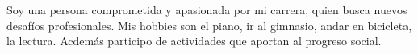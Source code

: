 Soy una persona comprometida y apasionada por mi carrera, quien busca nuevos desafíos profesionales.
Mis hobbies son el piano, ir al gimnasio, andar en bicicleta, la lectura. Acdemás participo de actividades que aportan al progreso social.